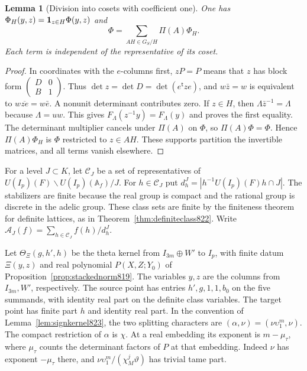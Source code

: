 \documentclass[a4paper,11pt]{article}
\newtheorem{lemma}[proposition]{Lemma}
\theoremstyle{definition}
\theoremstyle{remark}
\numberwithin{equation}{section}
\begin{document}
\begin{lemma}[Division into cosets with coefficient one]
\leavevmode\label{lem:rowcosets824}
One has \(\Phi_H(y,z)={\bf1}_{z\in H}\Phi(y,z)\) and
\[
                 \Phi=\sum_{A H\in G_S/H}\Pi(A)\Phi_H .
\]
Each term is independent of the representative of its coset.
\end{lemma}
\begin{proof}
In coordinates with the \(e\)-columns first, \(zP=P\) means
that \(z\) has block form
\(\left(\begin{smallmatrix}D&0\\ B&1\end{smallmatrix}\right)\).
Thus \(\det z=\det D=\det(e^{\mathsf t}ze)\), and
\(w\bar z=w\) is equivalent to \(w\overline{ze}=w\bar e\).
A nonunit determinant contributes zero. If \(z\in H\), then
\(\Lambda\bar z^{-1}=\Lambda\) because \(\Lambda=uw\). This gives
\(F_\Lambda(z^{-1}y)=F_\Lambda(y)\) and proves the first equality.
The determinant multiplier cancels under \(\Pi(A)\) on \(\Phi\),
so \(\Pi(A)\Phi=\Phi\). Hence \(\Pi(A)\Phi_H\) is \(\Phi\)
restricted to \(z\in AH\). These supports partition the invertible
matrices, and all terms vanish elsewhere.
\end{proof}

For a level \(J\subset K\), let \(\mathcal C_J\) be a set of
representatives of \(U(I_p)(F)\backslash U(I_p)(\mathbb A_f)/J\).
For \(h\in\mathcal C_J\) put
\(d_h^J=|h^{-1}U(I_p)(F)h\cap J|\). The stabilizers are finite
because the real group is compact and the rational group is
discrete in the adelic group. These class sets are finite by the
finiteness theorem for definite lattices, as in
Theorem~\ref{thm:definiteclass822}. Write
\(\mathcal A_J(f)=\sum_{h\in\mathcal C_J}f(h)/d_h^J\).

Let \(\Theta_{\Xi}(g,h',h)\) be the theta kernel from
\(I_{3m}\oplus W'\) to \(I_p\), with finite datum \(\Xi(y,z)\)
and real polynomial \(P(X,Z;Y_0)\) of
Proposition~\ref{prop:stackednorm819}. The variables \(y,z\) are
the columns from \(I_{3m},W'\), respectively. The source point
has entries \(h',g,1,1,b_0\) on the five summands, with identity
real part on the definite class variables. The target point has
finite part \(h\) and identity real part. In the convention of
Lemma~\ref{lem:signkernel823}, the two splitting characters
are \((\alpha,\nu)=(\nu\upsilon_1^m,\nu)\). The compact
restriction of \(\alpha\) is \(\chi\). At a real embedding its
exponent is \(m-\mu_\tau\), where \(\mu_\tau\) counts the
determinant factors of \(P\) at that embedding. Indeed \(\nu\)
has exponent \(-\mu_\tau\) there, and
\(\nu\upsilon_1^m/(\chi_M^j\vartheta)\) has trivial tame part.
\end{document}
